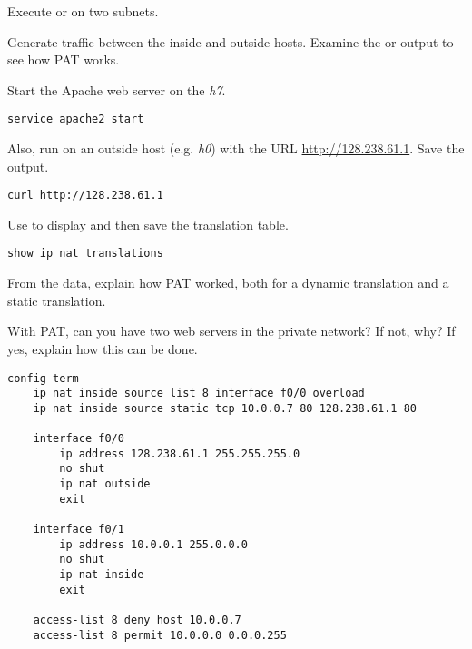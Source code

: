 \documentclass{../UTNetLab}
\begin{document}
Execute  or  on two subnets.

Generate traffic between the inside and outside hosts.
Examine the  or  output to see how PAT works.

Start the Apache web server on the \textit{h7}.

\begin{lstlisting}
service apache2 start
\end{lstlisting}

Also, run  on an outside host (e.g. \textit{h0}) with the URL \url{http://128.238.61.1}.
Save the  output.

\begin{lstlisting}
curl http://128.238.61.1
\end{lstlisting}

Use  to display and then save the translation table.

\begin{lstlisting}[frame=trBL]
show ip nat translations
\end{lstlisting}

\begin{report}
    \item From the  data, explain how PAT worked, both for a dynamic translation and a static translation.

    \item With PAT, can you have two web servers in the private network?
    If not, why?
    If yes, explain how this can be done.
\end{report}

\begin{lstlisting}[caption={PAT Router Configuration in \hyperref[fig:8.7]{Figure~8.7} (Table~8.6)\label{tab:8.6}}]
config term
    ip nat inside source list 8 interface f0/0 overload
    ip nat inside source static tcp 10.0.0.7 80 128.238.61.1 80

    interface f0/0
        ip address 128.238.61.1 255.255.255.0
        no shut
        ip nat outside
        exit

    interface f0/1
        ip address 10.0.0.1 255.0.0.0
        no shut
        ip nat inside
        exit

    access-list 8 deny host 10.0.0.7
    access-list 8 permit 10.0.0.0 0.0.0.255
\end{lstlisting}
\end{document}
